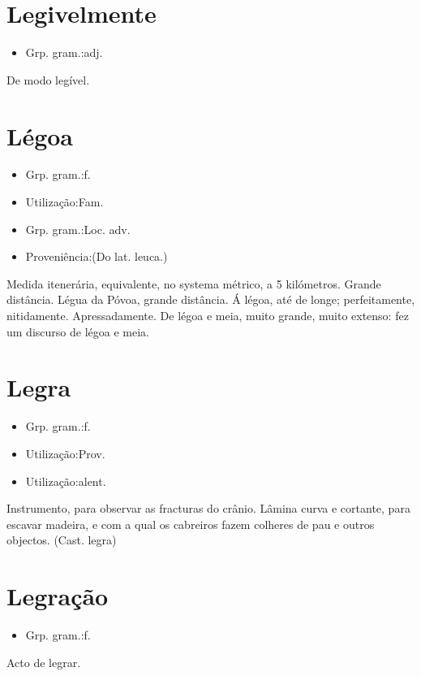 \section{Legivelmente}
\begin{itemize}
\item {Grp. gram.:adj.}
\end{itemize}
De modo legível.
\section{Légoa}
\begin{itemize}
\item {Grp. gram.:f.}
\end{itemize}
\begin{itemize}
\item {Utilização:Fam.}
\end{itemize}
\begin{itemize}
\item {Grp. gram.:Loc. adv.}
\end{itemize}
\begin{itemize}
\item {Proveniência:(Do lat. \textunderscore leuca\textunderscore .)}
\end{itemize}
Medida itenerária, equivalente, no systema métrico, a 5 kilómetros.
Grande distância.
\textunderscore Légua da Póvoa\textunderscore , grande distância.
\textunderscore Á légoa\textunderscore , até de longe; perfeitamente, nitidamente.
Apressadamente.
\textunderscore De légoa e meia\textunderscore , muito grande, muito extenso: \textunderscore fez um discurso de légoa e meia\textunderscore .
\section{Legra}
\begin{itemize}
\item {Grp. gram.:f.}
\end{itemize}
\begin{itemize}
\item {Utilização:Prov.}
\end{itemize}
\begin{itemize}
\item {Utilização:alent.}
\end{itemize}
Instrumento, para observar as fracturas do crânio.
Lâmina curva e cortante, para escavar madeira, e com a qual os cabreiros fazem colheres de pau e outros objectos.
(Cast. \textunderscore legra\textunderscore )
\section{Legração}
\begin{itemize}
\item {Grp. gram.:f.}
\end{itemize}
Acto de legrar.
